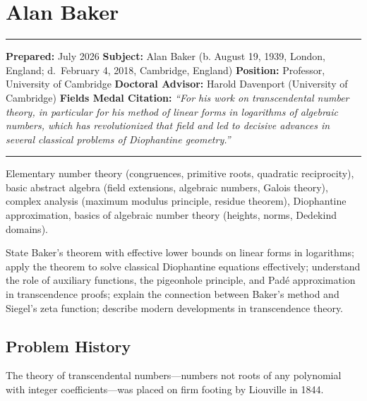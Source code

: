 \chapter{Alan Baker}\label{ch1970alanbaker:alan-baker-fields-medal-1970-a-comprehensive-report}

\begin{center}\rule{0.5\linewidth}{0.5pt}\end{center}

\textbf{Prepared:} July 2026
\textbf{Subject:} Alan Baker (b. August 19, 1939, London, England; d.~February 4, 2018, Cambridge, England)
\textbf{Position:} Professor, University of Cambridge
\textbf{Doctoral Advisor:} Harold Davenport (University of Cambridge)
\textbf{Fields Medal Citation:} \emph{``For his work on transcendental number theory, in particular for his method of linear forms in logarithms of algebraic numbers, which has revolutionized that field and led to decisive advances in several classical problems of Diophantine geometry.''}

\begin{center}\rule{0.5\linewidth}{0.5pt}\end{center}

\begin{prereqs}
Elementary number theory (congruences, primitive roots, quadratic reciprocity), basic abstract algebra (field extensions, algebraic numbers, Galois theory), complex analysis (maximum modulus principle, residue theorem), Diophantine approximation, basics of algebraic number theory (heights, norms, Dedekind domains).
\end{prereqs}

\begin{objectives}
State Baker's theorem with effective lower bounds on linear forms in logarithms; apply the theorem to solve classical Diophantine equations effectively; understand the role of auxiliary functions, the pigeonhole principle, and Pad\'e approximation in transcendence proofs; explain the connection between Baker's method \cite{baker1966} and Siegel's zeta function; describe modern developments in transcendence theory.
\end{objectives}

\section{Problem History}

The theory of transcendental numbers---numbers not roots of any polynomial with integer coefficients---was placed on firm footing by Liouville in 1844.

